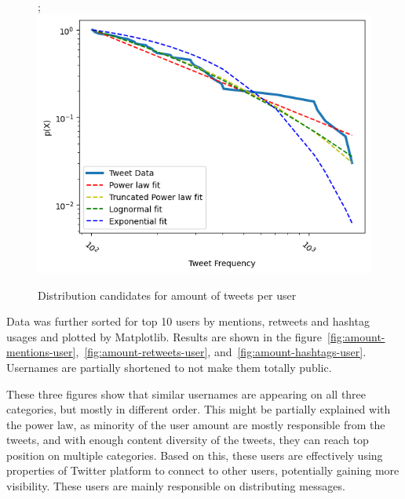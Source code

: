 \documentclass[conference]{IEEEtran}
\begin{document}
\begin{figure};
\includegraphics[scale=0.5]{figures/amount_tweets_powerlaw}
\caption{Distribution candidates for amount of tweets per user}
\label{fig:amount-tweets-powerlaw}
\end{figure}

Data was further sorted for top 10 users by mentions, retweets and hashtag usages and plotted by Matplotlib.
Results are shown in the figure~\ref{fig:amount-mentions-user},~\ref{fig:amount-retweets-user}, and~\ref{fig:amount-hashtags-user}.
Usernames are partially shortened to not make them totally public.

These three figures show that similar usernames are appearing on all three categories, but mostly in different order.
This might be partially explained with the power law, as minority of the user amount are mostly responsible from the tweets,
and with enough content diversity of the tweets, they can reach top position on multiple categories.
Based on this, these users are effectively using properties of Twitter platform to connect to other users, potentially gaining more visibility.
These users are mainly responsible on distributing messages.
\end{document}
